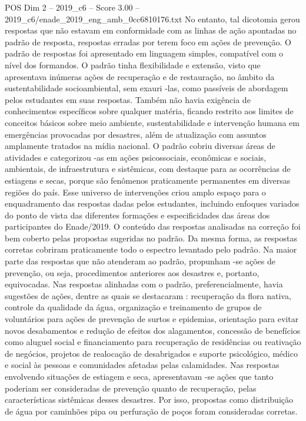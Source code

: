 \begin{textsample}{POS Dim 2 – 2019\_c6 – Score 3.00 – 2019\_c6/enade\_2019\_eng\_amb\_0cc6810176.txt}
No entanto, tal dicotomia gerou respostas que não estavam em conformidade com as linhas de ação apontadas no padrão de resposta, respostas erradas por terem foco em ações de prevenção.
O padrão de respostas foi apresentado em linguagem simples, compatível com o nível dos formandos.
O padrão tinha flexibilidade e extensão, visto que apresentava inúmeras ações de recuperação e de restauração, no âmbito da sustentabilidade socioambiental, sem exauri -las, como passíveis de abordagem pelos estudantes em suas respostas.
Também não havia exigência de conhecimentos específicos sobre qualquer matéria, ficando restrito aos limites de conceitos básicos sobre meio ambiente, sustentabilidade e intervenção humana em emergências provocadas por desastres, além de atualização com assuntos amplamente tratados na mídia nacional.
O padrão cobriu diversas áreas de atividades e categorizou -as em ações psicossociais, econômicas e sociais, ambientais, de infraestrutura e sistêmicas, com destaque para as ocorrências de estiagens e secas, porque são fenômenos praticamente permanentes em diversas regiões do país.
Esse universo de intervenções criou amplo espaço para o enquadramento das respostas dadas pelos estudantes, incluindo enfoques variados do ponto de vista das diferentes formações e especificidades das áreas dos participantes do Enade/2019.
O conteúdo das respostas analisadas na correção foi bem coberto pelas propostas sugeridas no padrão.
Da mesma forma, as respostas corretas cobriram praticamente todo o espectro levantado pelo padrão.
Na maior parte das respostas que não atenderam ao padrão, propunham -se ações de prevenção, ou seja, procedimentos anteriores aos desastres e, portanto, equivocadas.
Nas respostas alinhadas com o padrão, preferencialmente, havia sugestões de ações, dentre as quais se destacaram : recuperação da flora nativa, controle da qualidade da água, organização e treinamento de grupos de voluntários para ações de prevenção de surtos e epidemias, orientação para evitar novos desabamentos e redução de efeitos dos alagamentos, concessão de benefícios como aluguel social e financiamento para recuperação de residências ou reativação de negócios, projetos de realocação de desabrigados e suporte psicológico, médico e social às pessoas e comunidades afetadas pelas calamidades.
Nas respostas envolvendo situações de estiagem e seca, apresentavam -se ações que tanto poderiam ser consideradas de prevenção quanto de recuperação, pelas características sistêmicas desses desastres.
Por isso, propostas como distribuição de água por caminhões pipa ou perfuração de poços foram consideradas corretas.

\end{textsample}
